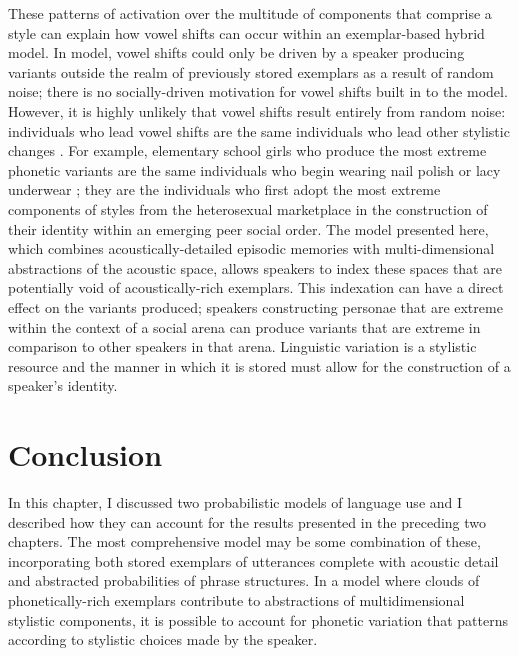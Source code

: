   
These patterns of activation over the multitude of components that comprise a style can explain how vowel shifts can occur within an exemplar-based hybrid model.  In  model, vowel shifts could only be driven by a speaker producing variants outside the realm of previously stored exemplars as a result of random noise; there is no socially-driven motivation for vowel shifts built in to the model.  However, it is highly unlikely that vowel shifts result entirely from random noise: individuals who lead vowel shifts are the same individuals who lead other stylistic changes \citep{labov2001}.  For example, elementary school girls who produce the most extreme phonetic variants are the same individuals who begin wearing nail polish or lacy underwear \citep{eckert1996nailpolish}; they are the individuals who first adopt the most extreme components of styles from the heterosexual marketplace in the construction of their identity within an emerging peer social order.  The model presented here, which combines acoustically-detailed episodic memories with multi-dimensional abstractions of the acoustic space, a\-llows speakers to index these spaces that are potentially void of acoustically-rich exemplars.  This indexation can have a direct effect on the variants produced; speakers constructing personae that are extreme within the context of a social arena can produce variants that are extreme in comparison to other speakers in that arena.  Linguistic variation is a stylistic resource and the manner in which it is stored must allow for the construction of a speaker's identity.


\section{Conclusion}

In this chapter, I discussed two probabilistic models of language use and I described how they can account for the results presented in the preceding two chapters.  The most comprehensive model may be some combination of these, incorporating both stored exemplars of utterances complete with acoustic detail and abstracted probabilities of phrase structures.  In a model where clouds of phonetically-rich exemplars contribute to abstractions of multidimensional stylistic components, it is possible to account for phonetic variation that patterns according to stylistic choices made by the speaker.  



